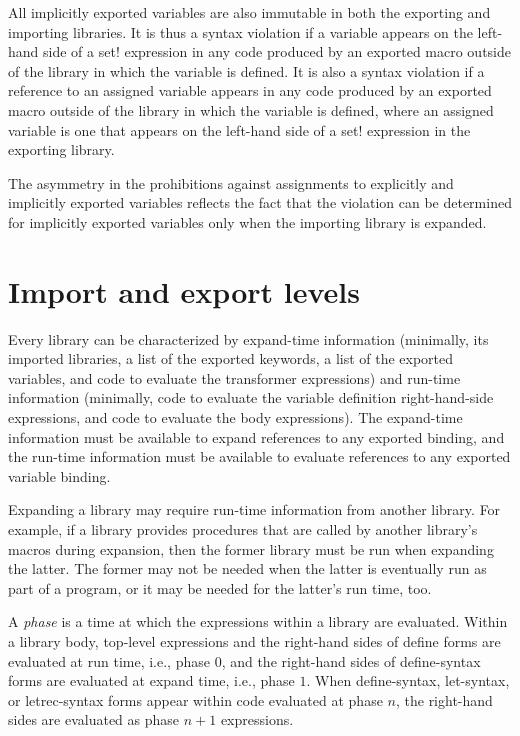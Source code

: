 All implicitly exported variables are also immutable in both the
exporting and importing libraries.
It is thus a syntax violation if a
variable appears on the left-hand side of a {\cf set!}
expression in any code produced by an exported macro outside of the
library in which the variable is defined.
It is also a syntax violation if a
reference to an assigned variable appears in any code produced by
an exported macro outside of the library in which the variable is defined,
where an assigned variable is one that appears on the left-hand
side of a {\cf set!} expression in the exporting library.

\begin{note}
The asymmetry in the prohibitions against assignments to
explicitly and implicitly exported variables reflects the fact that the
violation can be determined for implicitly exported variables only when the
importing library is expanded.
\end{note}

\section{Import and export levels}
\label{phasessection}

Every library can be characterized by expand-time information (minimally,
its imported libraries, a list of the exported keywords, a list of the
exported variables, and code to evaluate the transformer expressions) and
run-time information (minimally, code to evaluate the variable definition
right-hand-side expressions, and code to evaluate the body expressions).
The expand-time information must be available to expand references to
any exported binding, and the run-time information must be available to
evaluate references to any exported variable binding.

Expanding a library may require run-time information from another
library. For example, if a library provides procedures that are called
by another library's macros during expansion, then the former library
must be run when expanding the latter. The former may not be needed
when the latter is eventually run as part of a program, or it may be
needed for the latter's run time, too.

%
A \emph{phase} is a time at which the expressions within a library are
evaluated.
Within a library body, top-level expressions and
the right-hand sides of {\cf define} forms are evaluated at run time,
i.e., phase $0$, and the right-hand
sides of {\cf define-syntax} forms are evaluated at expand time, i.e.,
phase $1$.
When {\cf define-syntax},
{\cf let-syntax}, or {\cf letrec-syntax}
forms appear within code evaluated at phase $n$, the right-hand sides
are evaluated as phase $n+1$ expressions.

